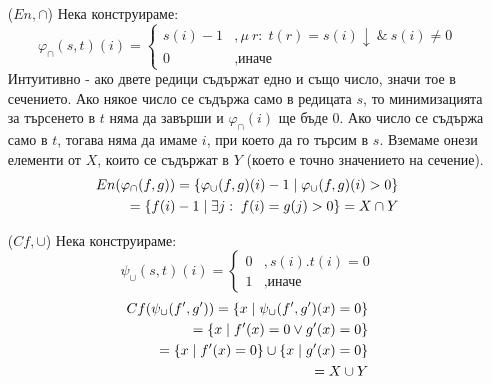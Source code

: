 \begin{solution}
\begin{itemize}
        \item[($En, \cap$)] Нека конструираме:
              \begin{equation}
                  \varphi_\cap(s,t)(i) = \begin{cases}
                      s\left(i\right) - 1 & , \mu\ r:\; t(r) = s\left(i\right) \downarrow\ \&\ s\left(i\right) \neq 0 \\
                      0                   & , \text{иначе}
                  \end{cases}
              \end{equation}
              Интуитивно - ако двете редици съдържат едно и също число, значи тое в сечението. Ако някое число се съдържа само в редицата $s$, то минимизацията за търсенето в $t$ няма да завърши и $\varphi_\cap(i)$ ще бъде 0. Ако число се съдържа само в $t$, тогава няма да имаме $i$, при което да го търсим в $s$. Вземаме онези елементи от $X$, които се съдържат в $Y$ (което е точно значението на сечение).
              \begin{equation}
                  \begin{split}
                      En(\varphi_\cap(f, g)) = \left\{\varphi_\cup(f, g)(i) - 1 \mid \varphi_\cup(f, g)(i) > 0\right\} \\
                      = \left\{f(i) - 1 \mid \exists j:\; f(i) = g(j) > 0\right\} = X \cap Y
                  \end{split}
              \end{equation}
        \item[($Cf, \cup$)] Нека конструираме:
              \begin{equation}
                  \psi_\cup(s, t)(i) = \begin{cases}
                      0 & , s(i).t(i) = 0 \\
                      1 & , \text{иначе}
                  \end{cases}
              \end{equation}
              \begin{equation}
                  \begin{split}
                      Cf(\psi_\cup(f', g')) = \set{x \mid \psi_\cup(f', g')(x) = 0} \\
                      = \set{x \mid f'(x) = 0 \lor g'(x) = 0}                       \\
                      = \set{x \mid f'(x) = 0 } \cup \set{x \mid g'(x) = 0}         \\
                      = X \cup Y

\end{split}
\end{equation}
\end{itemize}
\end{solution}
